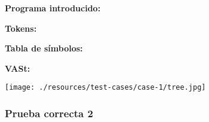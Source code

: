 \documentclass[11pt, , a4paper, titlepage]{article}
\newenvironment{changemargin}[2]{%
\begin{list}{}{%
\setlength{\topsep}{0pt}%
\setlength{\leftmargin}{#1}%
\setlength{\rightmargin}{#2}%
\setlength{\listparindent}{\parindent}%
\setlength{\itemindent}{\parindent}%
\setlength{\parsep}{\parskip}%
}%
\item[]}{\end{list}}
\begin{document}
\begin{changemargin}{+0.5cm}{+0cm}
    \vspace{1mm}                                                                 
    
    \textbf{Programa introducido:}
    \begin{changemargin}{+0.5cm}{+0cm}
        
    \end{changemargin}

    \vspace{2mm}                                                                 

    \textbf{Tokens:}
    \vspace{1mm}                                                                 
    \begin{changemargin}{+0.5cm}{+0cm}
    \end{changemargin}

    \vspace{2mm}                                                                 

    \textbf{Tabla de símbolos:}
    \vspace{1mm}                                                                 
    \begin{changemargin}{+0.5cm}{+0cm}
    \end{changemargin}

    \vspace{2mm}                                                                 
    \clearpage                                                                 

    \textbf{VASt:}
    \vspace{1mm} 
    \begin{center}
        \texttt{[image: ./resources/test-cases/case-1/tree.jpg]}
    \end{center}             

\end{changemargin}
\clearpage

\subsubsection{Prueba correcta 2}
\end{document}

